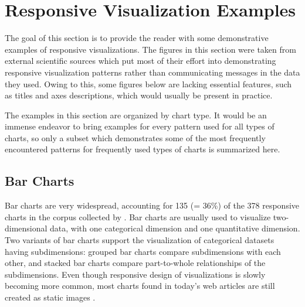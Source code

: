 \section{Responsive Visualization Examples}


The goal of this section is to provide the reader with some
demonstrative examples of responsive visualizations.  The figures in
this section were taken from external scientific sources which put
most of their effort into demonstrating responsive visualization
patterns rather than communicating messages in the data they used.
Owing to this, some figures below are lacking essential features, such
as titles and axes descriptions, which would usually be present in
practice.


The examples in this section are organized by chart type. It would be
an immense endeavor to bring examples for every pattern used for all
types of charts, so only a subset which demonstrates some of the most
frequently encountered patterns for frequently used types of charts is
summarized here.













\subsection{Bar Charts}
\label{sec:BarChartExamples}

Bar charts are very widespread, accounting for 135 (= 36\%) of the 378
responsive charts in the corpus collected by
\textcite{DesignPatternsTradeOffsRespVis}. Bar charts are usually used
to visualize two-dimensional data, with one categorical dimension and
one quantitative dimension. Two variants of bar charts support the
visualization of categorical datasets having subdimensions: grouped
bar charts \parencite{GroupedBar} compare subdimensions with each
other, and stacked bar charts \parencite{StackedBar} compare
part-to-whole relationships of the subdimensions. Even though
responsive design of visualizations is slowly becoming more common,
most charts found in today's web articles are still created as static
images \parencite{HBar,VBar,HVBar,MapBarLine}.

